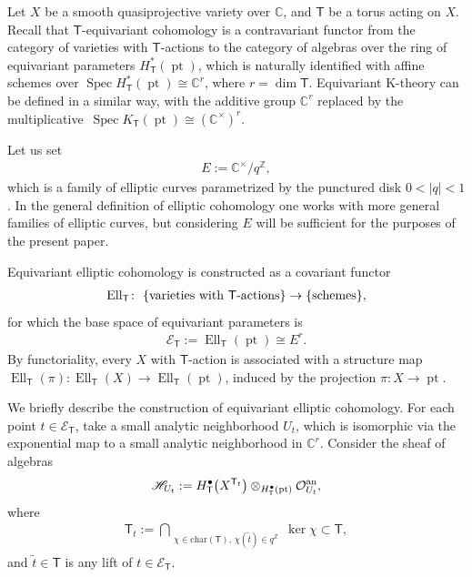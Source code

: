 \documentclass[10pt,a4paper]{amsart}
\DeclareMathOperator\pt{pt}
\def\Z{{\mathbb Z}}
\def\C{{\mathbb C}}
\newcommand{\bT}{\mathsf{T}}
\def\Oc{{\mathcal O}}
\newcommand{\sE}{\mathscr{E}}
\newcommand{\cE}{\mathscr{E}}
\newcommand{\Spec}{\operatorname{Spec}}
\newcommand{\Ell}{\operatorname{Ell}}
\numberwithin{equation}{section}
\begin{document}
Let $X$ be a smooth quasiprojective variety over $\C$, and $\bT$ be a torus acting on $X$. Recall that $\bT$-equivariant cohomology is a contravariant functor from the category of varieties with $\bT$-actions to the category of algebras over the ring of equivariant parameters $H^*_\bT (\pt)$, which is naturally identified with affine schemes over $\Spec H^*_\bT (\pt) \cong \C^r$, where $r = \dim \bT$. Equivariant K-theory can be defined in a similar way, with the additive group $\C^r$ replaced by the multiplicative~$\Spec K_\bT (\pt) \cong (\C^{\times})^r$.

Let us set
\begin{gather*}
E := \C^{\times} / q^{\Z},
\end{gather*}
which is a family of elliptic curves parametrized by the punctured disk $0<|q|<1$. In the general definition of elliptic cohomology one works with more general families of elliptic curves, but considering $E$ will be sufficient for the purposes of the present paper.

Equivariant elliptic cohomology is constructed as a covariant functor
\begin{gather*}
\Ell_\bT\colon \ \{ \text{varieties with $\bT$-actions} \} \rightarrow \{ {\rm schemes}\},
\end{gather*}
for which the base space of equivariant parameters is
\begin{gather*}
\sE_\bT := \Ell_\bT (\pt) \cong E^r.
\end{gather*}
By functoriality, every $X$ with $\bT$-action is associated with a structure map $ \Ell_\bT(\pi)\colon \Ell_\bT (X) \to \Ell_\bT(\pt)$, induced by the projection $\pi\colon X \to \pt$.

We briefly describe the construction of equivariant elliptic cohomology. For each point $t\in \sE_\bT$, take a small analytic neighborhood $U_t$, which is isomorphic via the exponential map to a small analytic neighborhood in $\C^r$. Consider the sheaf of algebras
\begin{gather*}
\mathscr{H}_{U_t} := H^\bullet_\bT \big(X^{\bT_t}\big) \otimes_{H^\bullet_\bT (\pt)} \Oc^{{\rm an}}_{U_t},
\end{gather*}
where
\begin{gather*}
\bT_t := \bigcap_{\substack{\chi \in \mathrm{char} (\bT),\, \chi(\tilde t) \in q^{\Z} }} \ker \chi \subset \bT,
\end{gather*}
and $\tilde t \in \bT$ is any lift of $t \in \cE_\bT$.
\end{document}
